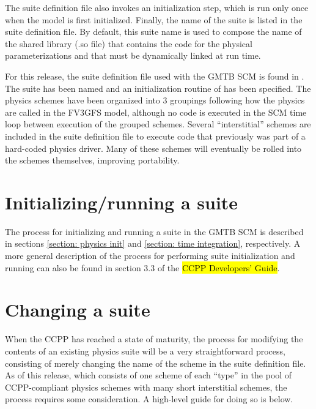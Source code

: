 The suite definition file also invokes an initialization step, which is run only once when the model is first initialized. Finally, the name of the suite is listed in the suite definition file. By default, this suite name is used to compose the name of the shared library (.so file) that contains the code for the physical parameterizations and that must be dynamically linked at run time.

For this release, the suite definition file used with the GMTB SCM is found in . The suite has been named  and an initialization routine of  has been specified. The physics schemes have been organized into 3 groupings following how the physics are called in the FV3GFS model, although no code is executed in the SCM time loop between execution of the grouped schemes. Several ``interstitial'' schemes are included in the suite definition file to execute code that previously was part of a hard-coded physics driver. Many of these schemes will eventually be rolled into the schemes themselves, improving portability.

\section{Initializing/running a suite}
The process for initializing and running a suite in the GMTB SCM is described in sections \ref{section: physics init} and \ref{section: time integration}, respectively. A more general description of the process for performing suite initialization and running can also be found in section 3.3 of the \hl{CCPP Developers' Guide}.

\section{Changing a suite}

When the CCPP has reached a state of maturity, the process for modifying the contents of an existing physics suite will be a very straightforward process, consisting of merely changing the name of the scheme in the suite definition file. As of this release, which consists of one scheme of each ``type'' in the pool of CCPP-compliant physics schemes with many short interstitial schemes, the process requires some consideration. A high-level guide for doing so is below.

